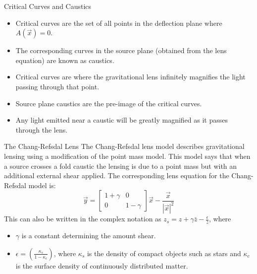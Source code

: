 \documentclass[aspectratio=1610,xcolor=dvipsnames,t]{beamer}
\begin{document}
\begin{frame}{Critical Curves and Caustics}
\begin{itemize} 
    \item Critical curves are the set of all points in the deflection plane where $A(\vec{x}) = 0$. 
    \item The corresponding curves in the source plane (obtained from the lens equation) are known as caustics.    \item Critical curves are where the gravitational lens infinitely magnifies the light passing through
          that point. 
    \item Source plane caustics are the pre-image of the critical curves.
    \item Any light emitted near a caustic will be greatly magnified as it passes through the lens. 
\end{itemize}
\end{frame} 

\begin{frame}{The Chang-Refsdal Lens}
The Chang-Refsdal lens model describes gravitational lensing using a modification
of the point mass model. This model says that when a source crosses a fold caustic
the lensing is due to a point mass but with an additional external shear applied.
The corresponding lens equation for the Chang-Refsdal model is:
\begin{equation}
    \vec{y} = \left[
                \begin{array}{cc}
                    1 + \gamma & 0   \\
                    0          & 1 - \gamma
                \end{array} 
              \right] \vec{x} - \frac{\vec{x}}{|\vec{x}|^2}
\end{equation}
This can also be written in the complex notation as 
$z_s = z + \gamma \bar{z} - \frac{\epsilon}{\bar{z}}$, where
\begin{itemize}
    \item $\gamma$ is a constant determining the amount shear.
    \item $\epsilon = (\frac{\kappa_s}{1 - \kappa_c})$, where $\kappa_s$ is
          the density of compact objects such as stars and $\kappa_c$ is the
          surface density of continuously distributed matter.
\end{itemize}
\end{frame} 

\end{document}
